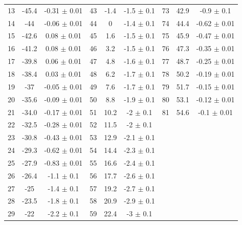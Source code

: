 \begin{table}[H]
\begin{tabular}{ccc|ccc|ccc}
  13  & -45.4  &   -0.31 $\pm$  0.01   &   43  &  -1.4   & -1.5  $\pm$  0.1   &    73  &  42.9   & -0.9  $\pm$  0.1   \\
  14  & -44    &   -0.06 $\pm$  0.01   &   44  &  0      & -1.4  $\pm$  0.1   &    74  &  44.4   & -0.62 $\pm$  0.01  \\
  15  & -42.6  &   0.08  $\pm$  0.01   &   45  &  1.6    & -1.5  $\pm$  0.1   &    75  &  45.9   & -0.47 $\pm$  0.01  \\
  16  & -41.2  &   0.08  $\pm$  0.01   &   46  &  3.2    & -1.5  $\pm$  0.1   &    76  &  47.3   & -0.35 $\pm$  0.01  \\
  17  & -39.8  &   0.06  $\pm$  0.01   &   47  &  4.8    & -1.6  $\pm$  0.1   &    77  &  48.7   & -0.25 $\pm$  0.01  \\
  18  & -38.4  &   0.03  $\pm$  0.01   &   48  &  6.2    & -1.7  $\pm$  0.1   &    78  &  50.2   & -0.19 $\pm$  0.01  \\
  19  & -37    &   -0.05 $\pm$  0.01   &   49  &  7.6    & -1.7  $\pm$  0.1   &    79  &  51.7   & -0.15 $\pm$  0.01  \\
  20  & -35.6  &   -0.09 $\pm$  0.01   &   50  &  8.8    & -1.9  $\pm$  0.1   &    80  &  53.1   & -0.12 $\pm$  0.01  \\
  21  & -34.0  &   -0.17 $\pm$  0.01   &   51  &  10.2   & -2    $\pm$  0.1   &    81  &  54.6   & -0.1  $\pm$  0.01  \\
  22  & -32.5  &   -0.28 $\pm$  0.01   &   52  &  11.5   & -2    $\pm$  0.1   &        &              &               \\    
  23  & -30.8  &   -0.43 $\pm$  0.01   &   53  &  12.9   & -2.1  $\pm$  0.1   &        &              &               \\    
  24  & -29.3  &   -0.62 $\pm$  0.01   &   54  &  14.4   & -2.3  $\pm$  0.1   &        &              &               \\    
  25  & -27.9  &   -0.83 $\pm$  0.01   &   55  &  16.6   & -2.4  $\pm$  0.1   &        &              &               \\    
  26  & -26.4  &   -1.1  $\pm$  0.1    &   56  &  17.7   & -2.6  $\pm$  0.1   &        &              &               \\    
  27  & -25    &   -1.4  $\pm$  0.1    &   57  &  19.2   & -2.7  $\pm$  0.1   &        &              &               \\    
  28  & -23.5  &   -1.8  $\pm$  0.1    &   58  &  20.9   & -2.9  $\pm$  0.1   &        &              &               \\    
  29  & -22    &   -2.2  $\pm$  0.1    &   59  &  22.4   & -3    $\pm$  0.1   &        &              &               \\    
  \bottomrule 
  \end{tabular}
  \label{tab:b15_data}
\end{table}

